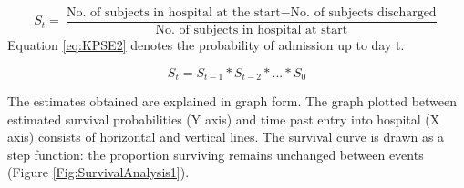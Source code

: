 \documentclass[../thesis.tex]{subfiles}
\begin{document}
\begin{equation}\label{eq:KPSE}
    S_{t} = \frac{\text{No. of subjects in hospital at the start} - \text{No. of subjects discharged}}{\text{No. of subjects in hospital at start}}
\end{equation}
Equation \ref{eq:KPSE2} denotes the probability of admission up to day t.

\begin{equation}\label{eq:KPSE2}
    S_{t} = S_{t-1} * S_{t-2} * ... * S_{0}
\end{equation}

\begin{landscape}
\begin{table}[h!]
\caption{Survival Analysis of all Patient Admissions {\hl{double check formatting}}}
\end{table}
\end{landscape}

The estimates obtained are explained in graph form. The graph plotted between estimated survival probabilities (Y axis) and time past entry into hospital (X axis) consists of horizontal and vertical lines. The survival curve is drawn as a step function: the proportion surviving remains unchanged between events (Figure \ref{Fig:SurvivalAnalysis1}).
\end{document}
